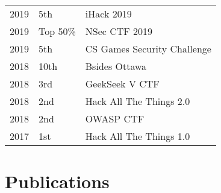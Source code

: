 \documentclass[]{deedy-resume-openfont}
\begin{document}
\begin{minipage}[t]{0.66\textwidth}
\begin{tabular}{rll}

2019      & 5th & iHack 2019\\

2019      & Top 50\% & NSec CTF 2019\\

2019      & 5th & CS Games Security Challenge\\

2018      & 10th & Bsides Ottawa\\

2018	     & 3rd & GeekSeek V CTF\\

2018	     & 2nd & Hack All The Things 2.0\\

2018	     & 2nd & OWASP CTF\\

2017	     & 1st & Hack All The Things 1.0\\

\end{tabular}
\sectionsep


\section{Publications} 
\renewcommand\refname{\vskip -1.5em} %


\nocite{*}

\end{minipage} 
\end{document}
